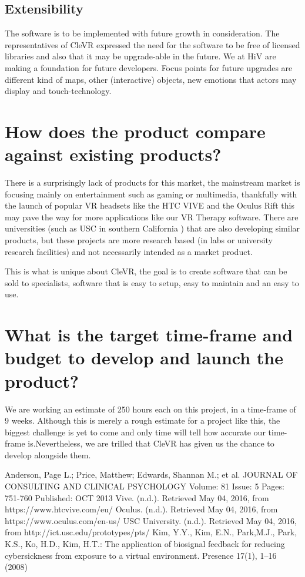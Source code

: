 \documentclass[11pt]{article}
\begin{document}
    \subsection{Extensibility}
    The software is to be implemented with future growth in consideration. The representatives of CleVR expressed the need for the software to be free of licensed libraries and also that it may be upgrade-able in the future. We at HiV are making a foundation for future developers.
    Focus points for future upgrades are different kind of maps, other (interactive) objects, new emotions that actors may display and touch-technology.
        
\section{How does the product compare against existing products?}
There is a surprisingly lack of products for this market, the mainstream market is focusing mainly on entertainment such as gaming or multimedia, thankfully with the launch of popular VR headsets like the HTC VIVE\cite{vive} and the Oculus Rift\cite{oculus} this may pave the way for more applications like our VR Therapy software.
\newline
There are universities (such as USC\cite{usc} in southern California ) that are also developing similar products, but these projects are more research based (in labs or university research facilities) and not necessarily intended as a market product.

This is what is unique about CleVR, the goal is to create software that can be sold to specialists, software that is easy to setup, easy to maintain and an easy to use. 

\section{What is the target time-frame and budget to develop and launch the product?}
	We are working an estimate of 250 hours each on this project, in a time-frame of 9 weeks. Although this is merely a rough estimate for a project like this, the biggest challenge is yet to come and only time will tell how accurate our time-frame is.Nevertheless, we are trilled that CleVR has given us the chance to develop alongside them.
    
\begin{thebibliography}{9}
Anderson, Page L.; Price, Matthew; Edwards, Shannan M.; et al.
JOURNAL OF CONSULTING AND CLINICAL PSYCHOLOGY  Volume: 81   Issue: 5   Pages: 751-760   Published: OCT 2013
Vive. (n.d.). Retrieved May 04, 2016, from https://www.htcvive.com/eu/
Oculus. (n.d.). Retrieved May 04, 2016, from https://www.oculus.com/en-us/
USC University. (n.d.). Retrieved May 04, 2016, from http://ict.usc.edu/prototypes/pts/
Kim, Y.Y., Kim, E.N., Park,M.J., Park, K.S., Ko, H.D., Kim, H.T.: The application of biosignal
feedback for reducing cybersickness from exposure to a virtual environment. Presence 17(1),
1–16 (2008)
\end{thebibliography}
	
\end{document}
